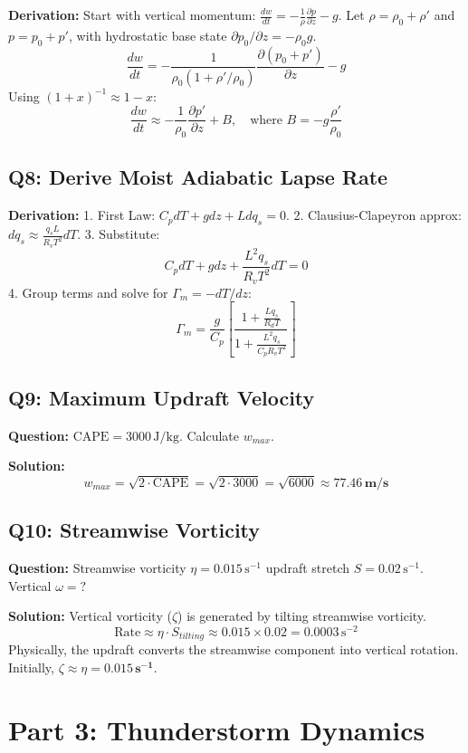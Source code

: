 \documentclass[11pt,a4paper]{article}
\begin{document}
\textbf{Derivation:}
Start with vertical momentum: $\frac{dw}{dt} = -\frac{1}{\rho}\frac{\partial p}{\partial z} - g$.
Let $\rho = \rho_0 + \rho'$ and $p = p_0 + p'$, with hydrostatic base state $\partial p_0 / \partial z = -\rho_0 g$.
\[ \frac{dw}{dt} = -\frac{1}{\rho_0(1+\rho'/\rho_0)} \frac{\partial(p_0+p')}{\partial z} - g \]
Using $(1+x)^{-1} \approx 1-x$:
\[ \frac{dw}{dt} \approx -\frac{1}{\rho_0}\frac{\partial p'}{\partial z} + B, \quad \text{where } B = -g\frac{\rho'}{\rho_0} \]

\subsection*{Q8: Derive Moist Adiabatic Lapse Rate}
\textbf{Derivation:}
1. First Law: $C_p dT + g dz + L dq_s = 0$.
2. Clausius-Clapeyron approx: $dq_s \approx \frac{q_s L}{R_v T^2} dT$.
3. Substitute:
\[ C_p dT + g dz + \frac{L^2 q_s}{R_v T^2} dT = 0 \]
4. Group terms and solve for $\Gamma_m = -dT/dz$:
\[ \Gamma_m = \frac{g}{C_p} \left[ \frac{1 + \frac{L q_s}{R_d T}}{1 + \frac{L^2 q_s}{C_p R_v T^2}} \right] \]

\subsection*{Q9: Maximum Updraft Velocity}
\textbf{Question:} $\text{CAPE}=3000\,\text{J/kg}$. Calculate $w_{max}$.

\textbf{Solution:}
\[ w_{max} = \sqrt{2 \cdot \text{CAPE}} = \sqrt{2 \cdot 3000} = \sqrt{6000} \approx \mathbf{77.46\,\text{m/s}} \]

\subsection*{Q10: Streamwise Vorticity}
\textbf{Question:} Streamwise vorticity $\eta=0.015\,\text{s}^{-1}$ updraft stretch $S=0.02\,\text{s}^{-1}$. Vertical $\omega=?$

\textbf{Solution:}
Vertical vorticity ($\zeta$) is generated by tilting streamwise vorticity.
\[ \text{Rate} \approx \eta \cdot S_{tilting} \approx 0.015 \times 0.02 = 0.0003\,\text{s}^{-2} \]
Physically, the updraft converts the streamwise component into vertical rotation. Initially, $\zeta \approx \eta = \mathbf{0.015\,\text{s}^{-1}}$.

\section*{Part 3: Thunderstorm Dynamics}
\end{document}
